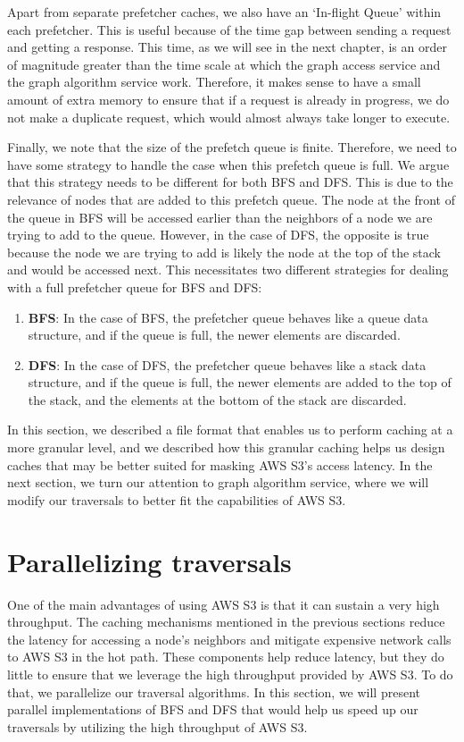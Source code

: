 \medskip
Apart from separate prefetcher caches, we also have an `In-flight Queue' within
each prefetcher. This is useful because of the time gap between sending a
request and getting a response. This time, as we will see in the next chapter,
is an order of magnitude greater than the time scale at which the graph access
service and the graph algorithm service work. Therefore, it makes sense to have
a small amount of extra memory to ensure that if a request is already in
progress, we do not make a duplicate request, which would almost always take
longer to execute. 

\medskip
Finally, we note that the size of the prefetch queue is finite. Therefore, we
need to have some strategy to handle the case when this prefetch queue is full.
We argue that this strategy needs to be different for both BFS and DFS. This is
due to the relevance of nodes that are added to this prefetch queue. The node at
the front of the queue in BFS will be accessed earlier than the neighbors of a
node we are trying to add to the queue. However, in the case of DFS, the
opposite is true because the node we are trying to add is likely the node
at the top of the stack and would be accessed next. This necessitates two
different strategies for dealing with a full prefetcher queue for BFS and DFS:
\begin{enumerate}
    \item \textbf{BFS}: In the case of BFS, the prefetcher queue behaves like a
        queue data structure, and if the queue is full, the newer elements are
        discarded.
    \item \textbf{DFS}: In the case of DFS, the prefetcher queue behaves like a
        stack data structure, and if the queue is full, the newer elements
        are added to the top of the stack, and the elements at the bottom of the
        stack are discarded.
\end{enumerate}

\bigskip
In this section, we described a file format that enables us to perform caching
at a more granular level, and we described how this granular caching helps us
design caches that may be better suited for masking AWS S3's access latency.
In the next section, we turn our
attention to graph algorithm service, where we will modify our traversals to
better fit the capabilities of AWS S3.


\section{Parallelizing traversals}\label{sec:parallelAlgorithms}
One of the main advantages of using AWS S3 is that it can sustain a very
high throughput. The caching mechanisms mentioned in the previous sections
reduce the latency for accessing a node's neighbors and mitigate expensive
network calls to AWS S3 in the hot path. These components help reduce
latency, but they do little to ensure that we leverage the
high throughput provided by AWS S3. To do that, we parallelize our
traversal algorithms. In this section, we will present parallel implementations
of BFS and DFS that would help us speed up our traversals by utilizing the
high throughput of AWS S3.

